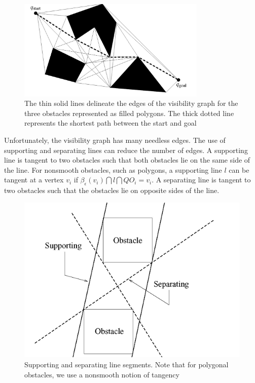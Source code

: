 \documentclass[11pt]{article}
\begin{document}
\begin{figure}[h]
  \centering
  \includegraphics[width=9cm]{imgs/shortest_path.png}
  \caption{The thin solid lines delineate the edges of the visibility graph for the three obstacles represented as filled polygons. The thick dotted line represents the shortest path between the start and goal}
\end{figure}

Unfortunately, the visibility graph has many needless edges. The use of supporting and separating lines can reduce the number of edges. A supporting line is tangent to two obstacles such that both obstacles lie on the same side of the line. For nonsmooth obstacles, such as polygons, a supporting line $l$ can be tangent at a vertex $v_i$ if $\beta_\epsilon(v_i) \bigcap l \bigcap QO_i = v_i $. A separating line is tangent to two obstacles such that the obstacles lie on opposite sides of the line.\\

\begin{figure}[h]
  \centering
  \includegraphics{imgs/Supporting_separating_line_segments.png}
  \caption{Supporting and separating line segments. Note that for polygonal obstacles, we use a nonsmooth notion of tangency}
\end{figure}
\end{document}
